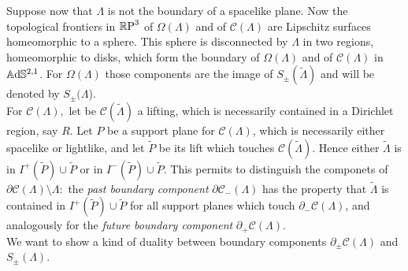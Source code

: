 Suppose now that $\Lambda$ is not the boundary of a spacelike plane. Now the topological frontiers in $\mathbb{R}\text{P}^3$ of $\Omega(\Lambda)$ and of $\mathcal{C}(\Lambda)$ are Lipschitz surfaces homeomorphic to a sphere. This sphere is disconnected by $\Lambda$ in two regions, homeomorphic to disks, which form the boundary of $\Omega(\Lambda)$ and of $\mathcal{C}(\Lambda)$ in $\mathbb{A}\mathrm{d}\mathbb{S}^{2,1}$. For $\Omega(\Lambda)$ those components are the image of $S_\pm(\widetilde{\Lambda})$ and will be denoted by $S_\pm(\Lambda$). \\
For $\mathcal{C}(\Lambda),$ let be $\mathcal{C}(\widetilde{\Lambda})$ a lifting, which is necessarily contained in a Dirichlet region, say $R$. Let $P$ be a support plane for $\mathcal{C}(\Lambda)$, which is necessarily either spacelike or lightlike, and let $\widetilde{P}$ be its lift which touches $\mathcal{C}(\widetilde{\Lambda}).$ Hence either $\widetilde{\Lambda}$ is in $I^+(\widetilde{P})\cup\widetilde{P}$ or in $I^-(\widetilde{P})\cup\widetilde{P}$. This permits to distinguish the componets of $\partial\mathcal{C}(\Lambda)\setminus\Lambda:$ the \textit{past boundary component} $\partial\mathcal{C}_-(\Lambda)$ has the property that $\widetilde{\Lambda}$ is contained in $I^+(\widetilde{P})\cup \widetilde{P}$ for all support planes which touch $\partial_-\mathcal{C}(\Lambda)$, and analogously for the \textit{future boundary component} $\partial_+\mathcal{C}(\Lambda)$.\\
We want to show a kind of duality between boundary components $\partial_\pm\mathcal{C}(\Lambda)$ and $S_\pm(\Lambda)$. 

